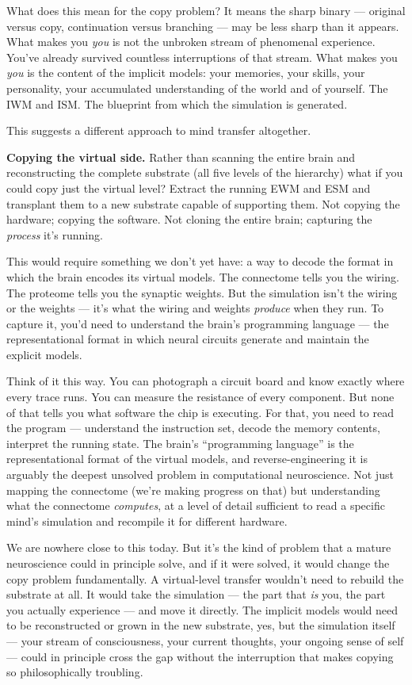 \documentclass[11pt, twoside, openright]{book}
\begin{document}
What does this mean for the copy problem? It means the sharp binary --- original versus copy, continuation versus branching --- may be less sharp than it appears. What makes you \textit{you} is not the unbroken stream of phenomenal experience. You've already survived countless interruptions of that stream. What makes you \textit{you} is the content of the implicit models: your memories, your skills, your personality, your accumulated understanding of the world and of yourself. The IWM and ISM. The blueprint from which the simulation is generated.

This suggests a different approach to mind transfer altogether.

\textbf{Copying the virtual side.} Rather than scanning the entire brain and reconstructing the complete substrate (all five levels of the hierarchy) what if you could copy just the virtual level? Extract the running EWM and ESM and transplant them to a new substrate capable of supporting them. Not copying the hardware; copying the software. Not cloning the entire brain; capturing the \textit{process} it's running.

This would require something we don't yet have: a way to decode the format in which the brain encodes its virtual models. The connectome tells you the wiring. The proteome tells you the synaptic weights. But the simulation isn't the wiring or the weights --- it's what the wiring and weights \textit{produce} when they run. To capture it, you'd need to understand the brain's programming language --- the representational format in which neural circuits generate and maintain the explicit models.

Think of it this way. You can photograph a circuit board and know exactly where every trace runs. You can measure the resistance of every component. But none of that tells you what software the chip is executing. For that, you need to read the program --- understand the instruction set, decode the memory contents, interpret the running state. The brain's ``programming language'' is the representational format of the virtual models, and reverse-engineering it is arguably the deepest unsolved problem in computational neuroscience. Not just mapping the connectome (we're making progress on that) but understanding what the connectome \textit{computes}, at a level of detail sufficient to read a specific mind's simulation and recompile it for different hardware.

We are nowhere close to this today. But it's the kind of problem that a mature neuroscience could in principle solve, and if it were solved, it would change the copy problem fundamentally. A virtual-level transfer wouldn't need to rebuild the substrate at all. It would take the simulation --- the part that \textit{is} you, the part you actually experience --- and move it directly. The implicit models would need to be reconstructed or grown in the new substrate, yes, but the simulation itself --- your stream of consciousness, your current thoughts, your ongoing sense of self --- could in principle cross the gap without the interruption that makes copying so philosophically troubling.
\end{document}
